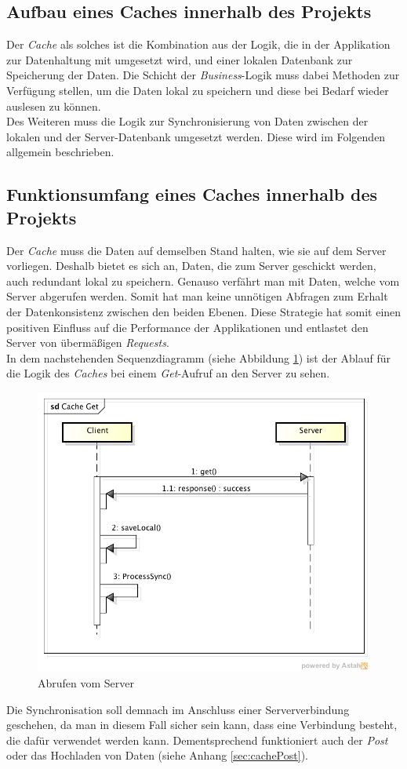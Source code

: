 \subsection{Aufbau eines Caches innerhalb des Projekts}
\label{ssec:cache-aufbau}
Der \textit{Cache} als solches ist die Kombination aus der Logik, die in der Applikation zur Datenhaltung mit umgesetzt wird, und einer lokalen Datenbank zur Speicherung der Daten. Die Schicht der \textit{Business}-Logik muss dabei Methoden zur Verfügung stellen, um die Daten lokal zu speichern und diese bei Bedarf wieder auslesen zu können.\\
Des Weiteren muss die Logik zur Synchronisierung von Daten zwischen der lokalen und der Server-Datenbank umgesetzt werden. Diese wird im Folgenden allgemein beschrieben.
\subsection{Funktionsumfang eines Caches innerhalb des Projekts}
\label{ssec:cache-unsere-funktionsweise}
Der \textit{Cache} muss die Daten auf demselben Stand halten, wie sie auf dem Server vorliegen. Deshalb bietet es sich an, Daten, die zum Server geschickt werden, auch redundant lokal zu speichern. Genauso verfährt man mit Daten, welche vom Server abgerufen werden. Somit hat man keine unnötigen Abfragen zum Erhalt der Datenkonsistenz zwischen den beiden Ebenen. Diese Strategie hat somit einen positiven Einfluss auf die Performance der Applikationen und entlastet den Server von übermäßigen \textit{Requests}. \\
In dem nachstehenden Sequenzdiagramm (siehe Abbildung \ref{pic:cacheGet}) ist der Ablauf für die Logik des \textit{Caches} bei einem \textit{Get}-Aufruf an den Server zu sehen.
\begin{figure}[!h]
\centering
\includegraphics[width=0.8\linewidth]{content/images/Cache-Get}
\caption{Abrufen vom Server}
\label{pic:cacheGet}
\end{figure}
Die Synchronisation soll demnach im Anschluss einer Serververbindung geschehen, da man in diesem Fall sicher sein kann, dass eine Verbindung besteht, die dafür verwendet werden kann. Dementsprechend funktioniert auch der \textit{Post} oder das Hochladen von Daten (siehe Anhang \ref{sec:cachePost}).